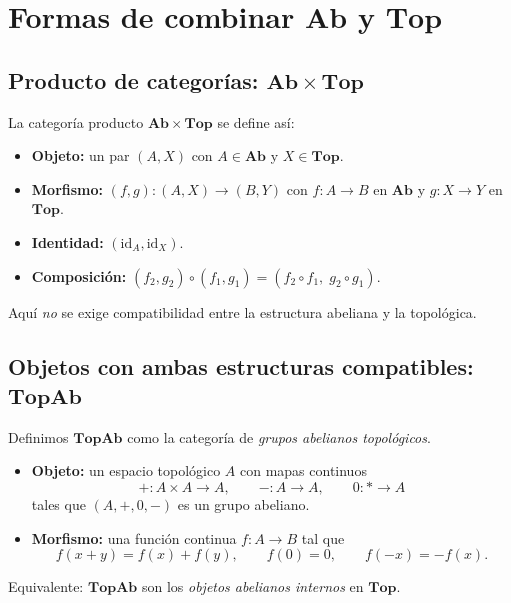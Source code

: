 \documentclass[12pt,oneside]{book}
\theoremstyle{definition}
\begin{document}
\chapter{Formas de combinar \texorpdfstring{$\mathbf{Ab}$}{Ab} y \texorpdfstring{$\mathbf{Top}$}{Top}}
\label{chap:combinar}

\section{Producto de categorías: \texorpdfstring{$\mathbf{Ab}\times\mathbf{Top}$}{Ab x Top}}
La categoría producto $\mathbf{Ab}\times\mathbf{Top}$ se define así:
\begin{itemize}[leftmargin=1.5em]
  \item \textbf{Objeto:} un par $(A,X)$ con $A\in\mathbf{Ab}$ y $X\in\mathbf{Top}$.
  \item \textbf{Morfismo:} $(f,g):(A,X)\to(B,Y)$ con $f:A\to B$ en $\mathbf{Ab}$
  y $g:X\to Y$ en $\mathbf{Top}$.
  \item \textbf{Identidad:} $(\mathrm{id}_A,\mathrm{id}_X)$.
  \item \textbf{Composición:} $(f_2,g_2)\circ(f_1,g_1)=(f_2\circ f_1,\;g_2\circ g_1)$.
\end{itemize}
Aquí \emph{no} se exige compatibilidad entre la estructura abeliana y la topológica.

\section{Objetos con ambas estructuras compatibles: \texorpdfstring{$\mathbf{TopAb}$}{TopAb}}
Definimos $\mathbf{TopAb}$ como la categoría de \emph{grupos abelianos topológicos}.
\begin{itemize}[leftmargin=1.5em]
  \item \textbf{Objeto:} un espacio topológico $A$ con mapas continuos
  \[
    +:A\times A\to A,\qquad -:A\to A,\qquad 0:* \to A
  \]
  tales que $(A,+,0,-)$ es un grupo abeliano.
  \item \textbf{Morfismo:} una función continua $f:A\to B$ tal que
  \[
    f(x+y)=f(x)+f(y),\qquad f(0)=0,\qquad f(-x)=-f(x).
  \]
\end{itemize}
Equivalente: $\mathbf{TopAb}$ son los \emph{objetos abelianos internos} en $\mathbf{Top}$.
\end{document}
